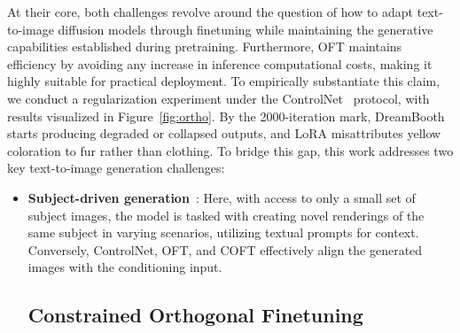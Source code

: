 {At their core, both challenges revolve around the question of how to adapt text-to-image diffusion models through finetuning while maintaining the generative capabilities established during pretraining. Furthermore, OFT maintains efficiency by avoiding any increase in inference computational costs, making it highly suitable for practical deployment. To empirically substantiate this claim, we conduct a regularization experiment under the ControlNet~\cite{zhang2023adding} protocol, with results visualized in Figure~\ref{fig:ortho}. By the 2000-iteration mark, DreamBooth starts producing degraded or collapsed outputs, and LoRA misattributes yellow coloration to fur rather than clothing. To bridge this gap, this work addresses two key text-to-image generation challenges:

\begin{itemize}[leftmargin=*,nosep]

    \item \textbf{Subject-driven generation}~\cite{ruiz2023dreambooth}: Here, with access to only a small set of subject images, the model is tasked with creating novel renderings of the same subject in varying scenarios, utilizing textual prompts for context. Conversely, ControlNet, OFT, and COFT effectively align the generated images with the conditioning input. \subsection{Constrained Orthogonal Finetuning}


\end{itemize}}

